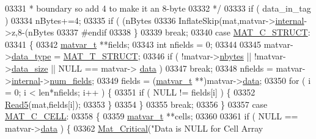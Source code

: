 \begin{DoxyCode}
{{{{{{{{{{{{{{{{{03331 \textcolor{comment}{                 * boundary so add 4 to make it an 8-byte}
03332 \textcolor{comment}{                 */}
03333                 \textcolor{keywordflow}{if} ( data\_in\_tag )
03334                     nBytes+=4;
03335                 \textcolor{keywordflow}{if} ( (nBytes %
03336                     InflateSkip(mat,matvar->\hyperlink{group___m_a_t_a6e97e3ed9f40c49322c18561c2a94e92}{internal}->z,8-(nBytes %
03337 \textcolor{preprocessor}{#endif}
03338             \}
03339             \textcolor{keywordflow}{break};
03340         \textcolor{keywordflow}{case} \hyperlink{group___m_a_t_ggad4d60ae7b709fc81bfd744fb4c857c40acb467c7749c80902b798134c729bb521}{MAT\_C\_STRUCT}:
03341         \{
03342             \hyperlink{group___m_a_t_structmatvar__t}{matvar\_t} **fields;
03343             \textcolor{keywordtype}{int} nfields = 0;
03344 
03345             matvar->\hyperlink{group___m_a_t_ab6aafe9bd77f0f077852593dec438144}{data\_type} = \hyperlink{group___m_a_t_ggacf7b3b879282b7ab3a51190e49bf3453a4f4d5a6e1d42c6aa81ffb810e5da5c85}{MAT\_T\_STRUCT};
03346             \textcolor{keywordflow}{if} ( !matvar->\hyperlink{group___m_a_t_abf1c844540503be2df9bb3db93cfe307}{nbytes} || !matvar->\hyperlink{group___m_a_t_a9ad1c82e2b568da617e12dc73a26e1f9}{data\_size} || NULL == matvar->
      \hyperlink{group___m_a_t_a5672978efa230bbdecdf38ede781f7fa}{data} )
03347                 \textcolor{keywordflow}{break};
03348             nfields = matvar->\hyperlink{group___m_a_t_a6e97e3ed9f40c49322c18561c2a94e92}{internal}->\hyperlink{structmatvar__internal_a93fc447484f455eddf9334f2e9e411c2}{num\_fields};
03349             fields = (\hyperlink{group___m_a_t_structmatvar__t}{matvar\_t} **)matvar->\hyperlink{group___m_a_t_a5672978efa230bbdecdf38ede781f7fa}{data};
03350             for ( i = 0; i < len*nfields; i++ ) \{
03351                 \textcolor{keywordflow}{if} ( NULL != fields[i] ) \{
03352                     \hyperlink{mat5_8c_abd8669832a02e759fe190bf2724f60ae}{Read5}(mat,fields[i]);
03353                 \}
03354             \}
03355             \textcolor{keywordflow}{break};
03356         \}
03357         \textcolor{keywordflow}{case} \hyperlink{group___m_a_t_ggad4d60ae7b709fc81bfd744fb4c857c40a2f7abb47a1c51e248bd4e5e03cc81b08}{MAT\_C\_CELL}:
03358         \{
03359             \hyperlink{group___m_a_t_structmatvar__t}{matvar\_t} **cells;
03360 
03361             \textcolor{keywordflow}{if} ( NULL == matvar->\hyperlink{group___m_a_t_a5672978efa230bbdecdf38ede781f7fa}{data} ) \{
03362                 \hyperlink{group__mat__util_gaf51f2bfbb5580f575e4dd79757e2b80c}{Mat\_Critical}(\textcolor{stringliteral}{"Data is NULL for Cell Array %
}}}}}}}}}}}}}}}}}}
\end{DoxyCode}
